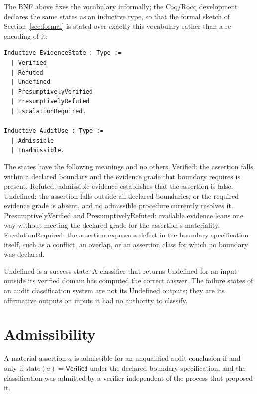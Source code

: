 \documentclass[smallcondensed,envcountsect,natbib]{svjour3}
\newcommand{\state}[1]{\textsf{#1}}
\begin{document}
The BNF above fixes the vocabulary informally; the Coq/Rocq development declares the same states as an inductive type, so that the formal sketch of Section~\ref{sec:formal} is stated over exactly this vocabulary rather than a re-encoding of it:

\begin{lstlisting}
Inductive EvidenceState : Type :=
  | Verified
  | Refuted
  | Undefined
  | PresumptivelyVerified
  | PresumptivelyRefuted
  | EscalationRequired.

Inductive AuditUse : Type :=
  | Admissible
  | Inadmissible.
\end{lstlisting}

The states have the following meanings and no others. \state{Verified}: the assertion falls within a declared boundary and the evidence grade that boundary requires is present. \state{Refuted}: admissible evidence establishes that the assertion is false. \state{Undefined}: the assertion falls outside all declared boundaries, or the required evidence grade is absent, and no admissible procedure currently resolves it. \state{PresumptivelyVerified} and \state{PresumptivelyRefuted}: available evidence leans one way without meeting the declared grade for the assertion's materiality. \state{EscalationRequired}: the assertion exposes a defect in the boundary specification itself, such as a conflict, an overlap, or an assertion class for which no boundary was declared.

\begin{remark}
\state{Undefined} is a success state. A classifier that returns \state{Undefined} for an input outside its verified domain has computed the correct answer. The failure states of an audit classification system are not its \state{Undefined} outputs; they are its affirmative outputs on inputs it had no authority to classify.
\end{remark}

\section{Admissibility}
\label{sec:admissibility}

\begin{definition}[Admissibility]
\label{def:admissibility}
A material assertion $a$ is admissible for an unqualified audit conclusion if and only if $\mathrm{state}(a) = \state{Verified}$ under the declared boundary specification, and the classification was admitted by a verifier independent of the process that proposed it.
\end{definition}
\end{document}
